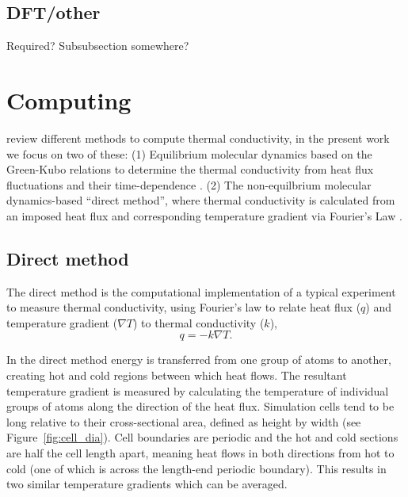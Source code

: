 \subsection{DFT/other}
Required? Subsubsection somewhere?



\section{Computing \tc}
\citet{Stackhouse2010} review different methods to compute thermal conductivity, in the present work we focus on two of these:
(1) Equilibrium molecular dynamics based on the Green-Kubo relations to determine the thermal conductivity from heat flux fluctuations and their time-dependence \citep{Green1954,Kubo1957,Kubo1966,Schelling2002}. 
(2) The non-equilbrium molecular dynamics-based ``direct method'', where thermal conductivity is calculated from an imposed heat flux and corresponding temperature gradient via Fourier's Law \citep{Muller-Plathe1997,Nieto-Draghi2013}.

\subsection{Direct method}
The direct method is the computational implementation of a typical experiment to measure thermal conductivity, using Fourier's law to relate heat flux ($q$) and temperature gradient ($\nabla{T}$) to thermal conductivity ($k$), 
\begin{equation}
q=-k \nabla{T} \label{fourier}.
\end{equation}

In the direct method energy is transferred from one group of atoms to another, creating hot and cold regions between which heat flows. The resultant temperature gradient is measured by calculating the temperature of individual groups of atoms along the direction of the heat flux. Simulation cells tend to be long relative to their cross-sectional area, defined as height by width (see Figure~\ref{fig:cell_dia}). Cell boundaries are periodic and the hot and cold sections are half the cell length apart, meaning heat flows in both directions from hot to cold (one of which is across the length-end periodic boundary). This results in two similar temperature gradients which can be averaged.


